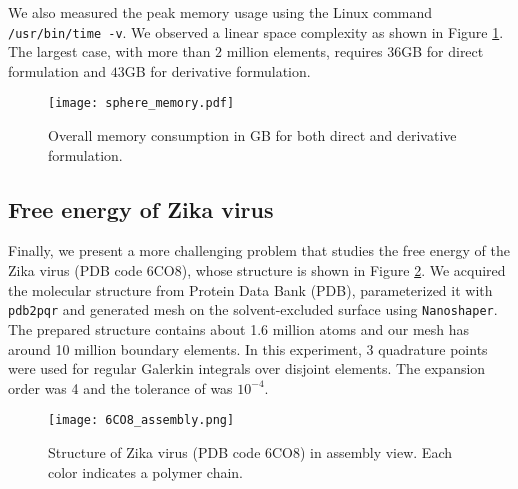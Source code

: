 We also measured the peak memory usage using the Linux command \texttt{/usr/bin/time -v}.
We observed a linear space complexity as shown in Figure \ref{fig:sphere_memory}.
The largest case, with more than $2$ million elements, requires $36$GB for direct formulation and $43$GB for derivative formulation.

\begin{figure}[htbp]
    \centering
    \texttt{[image: sphere\_memory.pdf]} 
    \caption{Overall memory consumption in GB for both direct and derivative formulation.}
    \label{fig:sphere_memory}
\end{figure}

\subsection{Free energy of Zika virus}

Finally, we present a more challenging problem that studies the free energy of the Zika virus (PDB code 6CO8), whose structure \cite{sevvana2018refinement} is shown in Figure \ref{fig:6CO8_assembly}.
We acquired the molecular structure from Protein Data Bank (PDB), parameterized it with \texttt{pdb2pqr} and generated mesh on the solvent-excluded surface using \texttt{Nanoshaper}.
The prepared structure contains about 1.6 million atoms and our mesh has around 10 million boundary elements.
In this experiment, 3 quadrature points were used for regular Galerkin integrals over disjoint elements.
The \fmm expansion order was 4 and the tolerance of \gmres was $10^{-4}$.

\begin{figure}[htbp]
    \centering
    \texttt{[image: 6CO8\_assembly.png]} 
    \caption{Structure of Zika virus (PDB code 6CO8) in assembly view. Each color indicates a polymer chain.}
    \label{fig:6CO8_assembly}
\end{figure}

